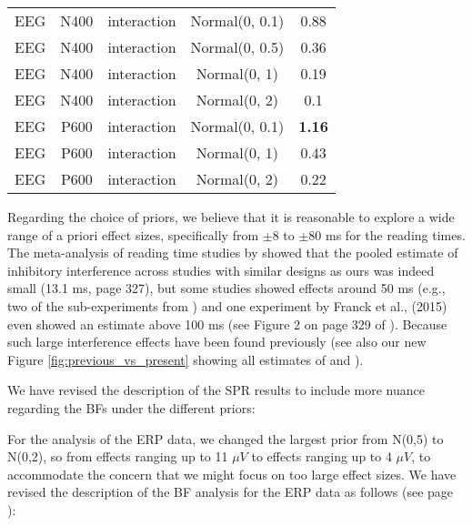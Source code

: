 \documentclass[12pt]{article}
\begin{document}
\begin{table}[h]
\begin{tabular}{ccccc}
EEG & N400 &interaction &Normal(0, 0.1)&0.88\\
EEG & N400 &interaction &Normal(0, 0.5)&0.36\\
EEG & N400 &interaction  & Normal(0, 1)&0.19\\
EEG & N400 &interaction  & Normal(0, 2) & 0.1\\
EEG & P600 &interaction &Normal(0, 0.1)& \textbf{1.16}\\
EEG & P600 &interaction &  Normal(0, 1) &0.43\\
EEG & P600 &interaction &  Normal(0, 2) &0.22\\
\bottomrule
\end{tabular}

\end{table}




Regarding the choice of priors, we believe that it is reasonable to explore a wide range of a priori effect sizes, specifically from $\pm$8 to $\pm$80 ms for the reading times. The meta-analysis of reading time studies by \textcite{jaeger_etal_2017} showed that the pooled estimate of inhibitory interference across studies with similar designs as ours was indeed small (13.1 ms, page 327), but some studies showed effects around 50 ms (e.g., two of the sub-experiments from \cite{vandyke07}) and one experiment by Franck et al., (2015) even showed an estimate above 100 ms (see Figure 2 on page 329 of \cite{jaeger_etal_2017}). Because such large interference effects have been found previously (see also our new Figure \ref{fig:previous_vs_present} showing all estimates of \cite{vandyke07} and \cite{mertzen}).

\newpage
We have revised the description of the SPR results to include more nuance regarding the BFs under the different priors:

\setcounter{figure}{4}
\begin{quote}
\end{quote}

For the analysis of the ERP data, we changed the largest prior from N(0,5) to N(0,2), so from effects ranging up to 11 $\mu V$ to effects ranging up to 4 $\mu V$, to accommodate the concern that we might focus on too large effect sizes. We have revised the description of the BF analysis for the ERP data as follows (see page \pageref{ERP_results3}):
\end{document}
